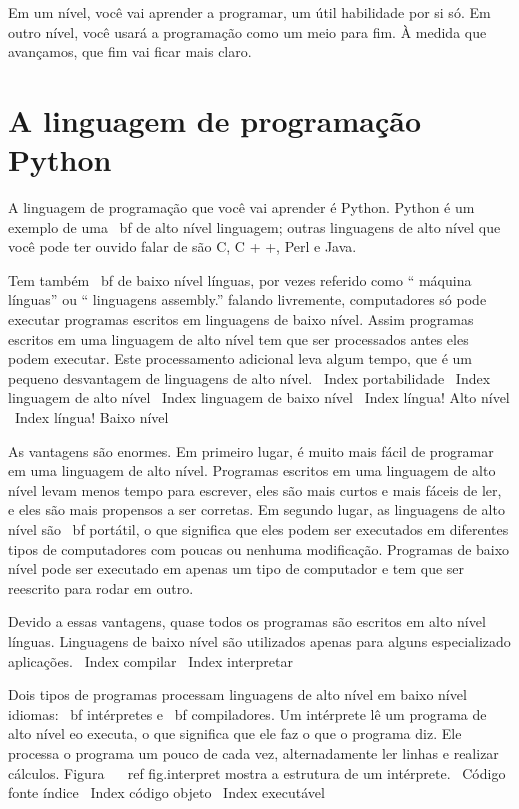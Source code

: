 \documentclass[10pt]{book}
\begin{document}
Em um nível, você vai aprender a programar, um útil
habilidade por si só. Em outro nível, você usará a programação como um meio para
fim. À medida que avançamos, que fim vai ficar mais claro.

\section {A linguagem de programação Python}

A linguagem de programação que você vai aprender é Python. Python é
um exemplo de uma {\ bf de alto nível linguagem}; outras linguagens de alto nível
que você pode ter ouvido falar de são C, C + +, Perl e Java.

Tem
também {\ bf de baixo nível línguas}, por vezes referido como `` máquina
línguas'' ou `` linguagens assembly.'' falando livremente, computadores
só pode executar programas escritos em linguagens de baixo nível. Assim
programas escritos em uma linguagem de alto nível tem que ser processados ​​antes
eles podem executar. Este processamento adicional leva algum tempo, que é um pequeno
desvantagem de linguagens de alto nível.
\ Index {} portabilidade
\ Index {linguagem de alto nível}
\ Index {linguagem de baixo nível}
\ Index {língua! Alto nível}
\ Index {língua! Baixo nível}

As vantagens são enormes. Em primeiro lugar, é muito mais fácil de programar
em uma linguagem de alto nível. Programas escritos em uma linguagem de alto nível
levam menos tempo para escrever, eles são mais curtos e mais fáceis de ler, e eles
são mais propensos a ser corretas. Em segundo lugar, as linguagens de alto nível são {\ bf
portátil}, o que significa que eles podem ser executados em diferentes tipos de computadores
com poucas ou nenhuma modificação. Programas de baixo nível pode ser executado em apenas um
tipo de computador e tem que ser reescrito para rodar em outro.

Devido a essas vantagens, quase todos os programas são escritos em alto nível
línguas. Linguagens de baixo nível são utilizados apenas para alguns especializado
aplicações.
\ Index {} compilar
\ Index {interpretar}

Dois tipos de programas processam linguagens de alto nível em baixo nível
idiomas: {\ bf intérpretes} e {\ bf compiladores}. Um intérprete
lê um programa de alto nível eo executa, o que significa que ele faz o que
o programa diz. Ele processa o programa um pouco de cada vez,
alternadamente ler linhas e realizar cálculos.
Figura ~ \ ref {fig.interpret} mostra a estrutura de um intérprete.
\ {Código fonte} índice
\ Index {código objeto}
\ Index {executável}
\end{document}
